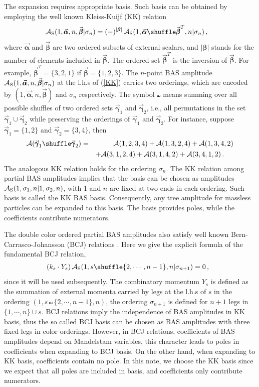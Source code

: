 \documentclass[preprint,showpacs,onecolumn,nofootinbib]{revtex4}
\newcommand{\bea}{\begin{eqnarray}}
\newcommand{\eea}{\end{eqnarray}}
\newcommand{\nn}{\nonumber \\}
\def\eref#1{(\ref{#1})}
\def\a{{\alpha}}
\def\b{{\beta}}
\begin{document}
The expansion requires appropriate basis.
Such basis can be obtained by employing the well known Kleiss-Kuijf (KK) relation \cite{Kleiss:1988ne}
%
\bea
{\cal A}_{\rm S}(1,\vec{\pmb{\a}},n,\vec{\pmb{\b}}|\sigma_n)=(-)^{|\pmb{\b}|}\,{\cal A}_{\rm S}(1,\vec{\pmb{\a}}\shuffle\vec{\pmb{\b}}^T,n|\sigma_n)\,,~~~\label{KK}
\eea
%
where $\vec{\pmb{\a}}$ and $\vec{\pmb{\b}}$ are two ordered subsets of external scalars, and $|\pmb{\b}|$ stands for the number of elements included in $\vec{\pmb{\b}}$. The ordered set $\vec{\pmb{\b}}^T$ is the inversion of $\vec{\pmb{\b}}$. For example, $\vec{\pmb{\b}}^T=\{3,2,1\}$ if $\vec{\pmb{\b}}=\{1,2,3\}$. The $n$-point BAS amplitude ${\cal A}_{\rm S}(1,\vec{\pmb{\a}},n,\vec{\pmb{\b}}|\sigma_n)$ at the l.h.s of \eref{KK} carries two orderings, which are encoded by $(1,\vec{\pmb{\a}},n,\vec{\pmb{\b}})$ and $\sigma_n$ respectively. The symbol $\shuffle$ means summing over all
possible shuffles of two ordered sets $\vec{\pmb{\gamma}}_1$ and $\vec{\pmb{\gamma}}_2$, i.e., all permutations in the set $\vec{\pmb{\gamma}}_1\cup \vec{\pmb{\gamma}}_2$ while preserving the orderings
of $\vec{\pmb{\gamma}}_1$ and $\vec{\pmb{\gamma}}_2$. For instance, suppose $\vec{\pmb{\gamma}}_1=\{1,2\}$ and $\vec{\pmb{\gamma}}_2=\{3,4\}$, then
%
\bea
{\cal A}(\vec{\pmb{\gamma}}_1\shuffle \vec{\pmb{\gamma}}_2)&=&{\cal A}(1,2,3,4)+{\cal A}(1,3,2,4)+{\cal A}(1,3,4,2)\nn
& &+{\cal A}(3,1,2,4)+{\cal A}(3,1,4,2)+{\cal A}(3,4,1,2)\,.~~~~\label{shuffle}
\eea
The analogous KK relation holds for the ordering $\sigma_n$.
The KK relation among partial BAS amplitudes implies that the basis can be chosen as amplitudes
${\cal A}_{\rm S}(1,\sigma_1,n|1,\sigma_2,n)$, with $1$ and $n$ are fixed at two ends in each ordering. Such basis is called the KK BAS basis. Consequently, any tree amplitude for massless particles can be expanded to this basis.
The basis provides poles, while the coefficients contribute numerators.

The double color ordered partial BAS amplitudes also satisfy well known Bern-Carrasco-Johansson (BCJ) relations \cite{Bern:2008qj,Chiodaroli:2014xia,Johansson:2015oia,Johansson:2019dnu}. Here we give the explicit formula of the fundamental BCJ relation,
%
\bea
(k_s\cdot Y_s)\,{\cal A}_{\rm S}(1,s\shuffle\{2,\cdots,n-1\},n|\sigma_{n+1})=0\,,~~\label{bcj}
\eea
%
since it will be used subsequently. The combinatory momentum $Y_s$ is defined as the summation of external momenta carried by legs at the l.h.s of $s$ in the ordering $(1,s\shuffle\{2,\cdots,n-1\},n)$, the ordering $\sigma_{n+1}$ is defined for $n+1$ legs in $\{1,\cdots,n\}\cup s$.
BCJ relations imply the independence of BAS amplitudes in KK basis, thus the so called BCJ basis can be chosen as BAS amplitudes with three fixed legs in color orderings. However, in BCJ relations, coefficients of BAS amplitudes depend on Mandelstam variables, this character leads to poles in coefficients when expanding to BCJ basis. On the other hand, when expanding to KK basis, coefficients contain no pole. In this note, we choose the KK basis since we expect that all poles are included in basis, and coefficients only contribute numerators.
\end{document}

